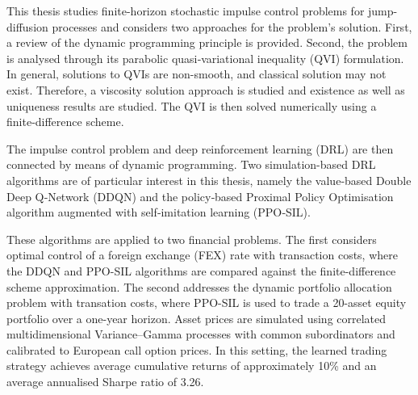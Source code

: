This thesis studies finite-horizon stochastic impulse control problems for jump-diffusion processes and considers two approaches for the problem's solution. First, a review of the dynamic programming principle is provided. Second, the problem is analysed through its parabolic quasi‑variational inequality (QVI) formulation. In general, solutions to QVIs are non-smooth, and classical solution may not exist. Therefore, a viscosity solution approach is studied and existence as well as uniqueness results are studied. The QVI is then solved numerically using a finite‑difference scheme.

The impulse control problem and deep reinforcement learning (DRL) are then connected by means of dynamic programming. Two simulation-based DRL algorithms are of particular interest in this thesis, namely the value‑based Double Deep Q‑Network (DDQN) and the policy‑based Proximal Policy Optimisation algorithm augmented with self‑imitation learning (PPO‑SIL).

These algorithms are applied to two financial problems. The first considers optimal control of a foreign exchange (FEX) rate with transaction costs, where the DDQN and PPO-SIL algorithms are compared against the finite-difference scheme approximation. The second addresses the dynamic portfolio allocation problem with transation costs, where PPO-SIL is used to trade a 20-asset equity portfolio over a one-year horizon. Asset prices are simulated using correlated multidimensional Variance–Gamma processes with common subordinators and calibrated to European call option prices. In this setting, the learned trading strategy achieves average cumulative returns of approximately 10\% and an average annualised Sharpe ratio of 3.26.